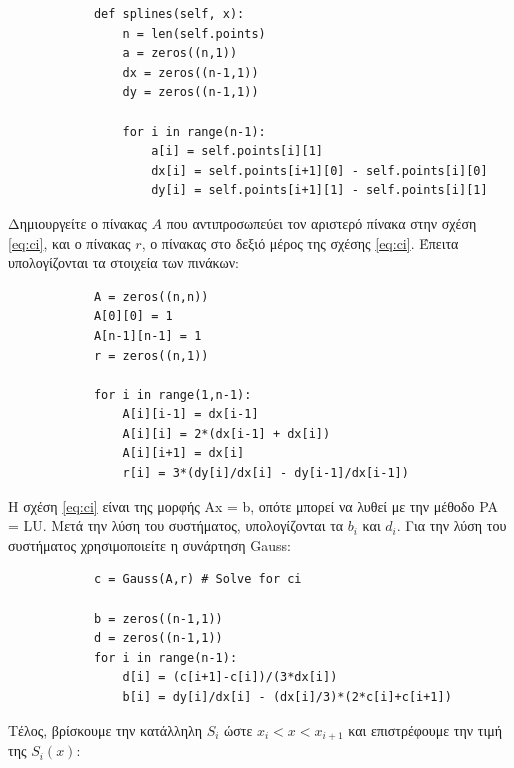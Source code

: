 \documentclass[a4paper,11pt]{article}
\newcommand{\lt}{\latintext}
\newcommand{\gt}{\greektext}
\begin{document}
{\begin{description}
    \lt
    \begin{verbatim}
            def splines(self, x):
                n = len(self.points)
                a = zeros((n,1))
                dx = zeros((n-1,1))
                dy = zeros((n-1,1))

                for i in range(n-1):
                    a[i] = self.points[i][1]
                    dx[i] = self.points[i+1][0] - self.points[i][0]        
                    dy[i] = self.points[i+1][1] - self.points[i][1]   
    \end{verbatim}
    \gt

Δημιουργείτε ο πίνακας $A$ που αντιπροσωπεύει τον αριστερό πίνακα στην σχέση \eqref{eq:ci}, και ο πίνακας $r$, ο πίνακας στο δεξιό μέρος της σχέσης \eqref{eq:ci}. Έπειτα υπολογίζονται τα στοιχεία των πινάκων:

    \lt
    \begin{verbatim}
            A = zeros((n,n))
            A[0][0] = 1
            A[n-1][n-1] = 1
            r = zeros((n,1))

            for i in range(1,n-1):
                A[i][i-1] = dx[i-1]
                A[i][i] = 2*(dx[i-1] + dx[i])
                A[i][i+1] = dx[i]
                r[i] = 3*(dy[i]/dx[i] - dy[i-1]/dx[i-1])
    \end{verbatim}
    \gt
Η σχέση \eqref{eq:ci} είναι της μορφής {\lt Ax = b}, οπότε μπορεί να λυθεί με την μέθοδο {\lt PA = LU}. Μετά την λύση του συστήματος, υπολογίζονται τα $b_i$ και $d_i$. Για την λύση του συστήματος χρησιμοποιείτε η συνάρτηση {\lt Gauss}:

    \lt
    \begin{verbatim}
            c = Gauss(A,r) # Solve for ci

            b = zeros((n-1,1))
            d = zeros((n-1,1))
            for i in range(n-1):
                d[i] = (c[i+1]-c[i])/(3*dx[i]) 
                b[i] = dy[i]/dx[i] - (dx[i]/3)*(2*c[i]+c[i+1])
    \end{verbatim}
    \gt

    
Τέλος, βρίσκουμε την κατάλληλη $S_i$ ώστε $x_i<x<x_{i+1}$ και επιστρέφουμε την τιμή της $S_i(x)$: 


\end{description}}
\end{document}

